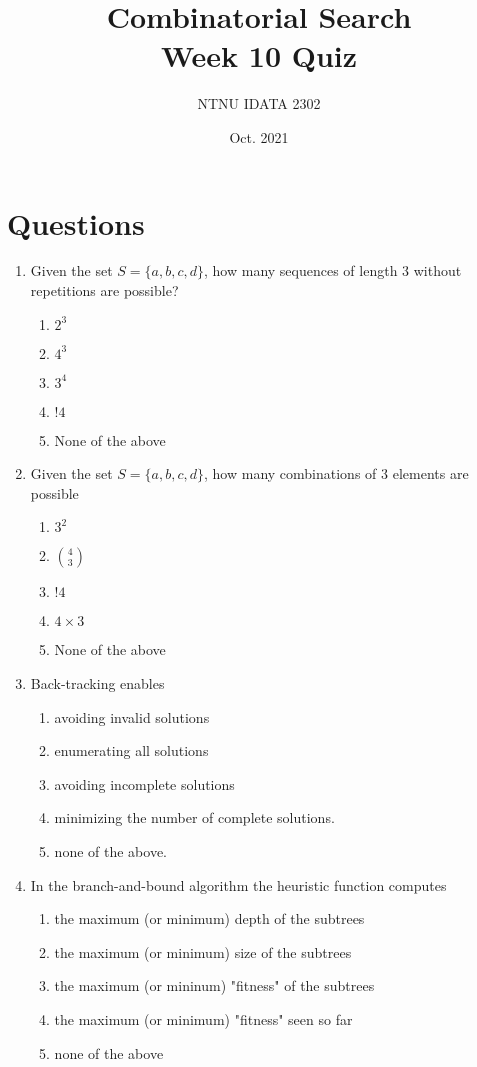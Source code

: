 \documentclass[11pt]{article}
\author{NTNU IDATA 2302}
\date{Oct. 2021}
\title{Combinatorial Search\\\medskip
\large Week 10 Quiz}
\begin{document}
\maketitle

\section{Questions}
\label{sec:orgc3530e7}

\begin{enumerate}
\item Given the set \(S=\{a, b, c, d\}\), how many sequences of length 3
without repetitions are possible?
\begin{enumerate}
\item \(2^3\)
\item \(4^3\)
\item \(3^4\)
\item \(!4\)
\item None of the above
\end{enumerate}

\item Given the set \(S=\{a, b, c, d\}\), how many combinations of 3 elements are
possible
\begin{enumerate}
\item \(3^2\)
\item \(\binom{4}{3}\)
\item \(!4\)
\item \(4 \times 3\)
\item None of the above
\end{enumerate}

\item Back-tracking enables
\begin{enumerate}
\item avoiding invalid solutions
\item enumerating all solutions
\item avoiding incomplete solutions
\item minimizing the number of complete solutions.
\item none of the above.
\end{enumerate}

\item In the branch-and-bound algorithm the heuristic function computes
\begin{enumerate}
\item the maximum (or minimum) depth of the subtrees
\item the maximum (or minimum) size of the subtrees
\item the maximum (or mininum) "fitness" of the subtrees
\item the maximum (or minimum) "fitness" seen so far
\item none of the above
\end{enumerate}


\end{enumerate}
\end{document}
